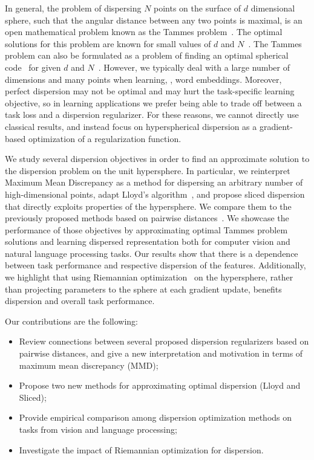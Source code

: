 \documentclass[10pt]{article} %
\begin{document}
In general, the problem of dispersing $N$ points on the surface of $d$ dimensional sphere, such that the angular distance between any two points is maximal, is an open mathematical problem known as the Tammes problem~\citep{tammes-1930}. The optimal solutions for this problem are known for small values of $d$ and $N$~\citep{GDZPPN002133873, DANZER19863, Waerdenvander1951, ROBINSON1961, musin-2012,tammes-problem-for-n14}. The Tammes problem can also be formulated as a problem of finding an optimal spherical code~\citep{alma990013623930205131} for given $d$ and $N$~\citep{table-spherical-codes}. However, we typically deal with a large number of dimensions and many points when learning, \eg, word embeddings. Moreover, perfect dispersion may not be optimal and may hurt the task-specific learning objective, so in learning applications we prefer being able to trade off between a task loss and a dispersion regularizer. For these reasons,
we cannot directly use classical results, and instead focus on hyperspherical dispersion as a gradient-based optimization of a regularization function.


We study several dispersion objectives in order to find an approximate solution to the dispersion problem on the unit hypersphere. In particular, we reinterpret Maximum Mean Discrepancy \citep[MMD,][]{JMLR:v13:gretton12a} as a method for dispersing an arbitrary number of high-dimensional points, adapt Lloyd's algorithm~\citep{lloyd1982}, and propose sliced dispersion that directly exploits properties of the hypersphere. We compare them to the previously proposed methods based on pairwise distances~\citep{mettes2019hyperspherical,sablayrolles2018spreading,pmlr-v130-liu21d,liu2018learning,pmlr-v119-wang20k}. We showcase the performance of those objectives by approximating optimal Tammes problem solutions and learning dispersed representation both for computer vision and natural language processing tasks. Our results show that there is a dependence between task performance and respective dispersion of the features.
Additionally, we highlight that using Riemannian optimization~\citep{bonnabel2013stochastic,becigneul2018riemannian} on the hypersphere, rather than projecting parameters to the sphere at each gradient update, benefits dispersion and overall task performance.

Our contributions are the following:
\begin{itemize}
    \item Review connections between several proposed dispersion regularizers based on pairwise distances, and give a new interpretation and motivation in terms of maximum mean discrepancy (MMD);
    \item Propose two new methods for approximating optimal dispersion (Lloyd and Sliced);
    \item Provide empirical comparison among dispersion optimization methods on tasks from vision and language processing;
    \item Investigate the impact of Riemannian optimization for dispersion.
\end{itemize}
\end{document}
